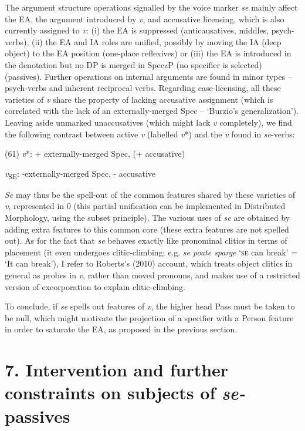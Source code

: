 \documentclass[output=paper]{langsci/langscibook}
\begin{document}
  The argument structure operations signalled by the voice marker \textit{se} mainly affect the EA, the argument introduced by \textit{v}, and accusative licensing, which is also currently assigned to \textit{v}: (i) the EA is suppressed (anticausatives, middles, psych-verbs), (ii) the EA and IA roles are unified, possibly by moving the IA (deep object) to the EA position (one-place reflexives) or (iii) the EA is introduced in the denotation but no DP is merged in Spec\textit{v}P (no specifier is selected) (passives). Further operations on internal arguments are found in minor types – psych-verbs and inherent reciprocal verbs. Regarding case-licensing, all these varieties of \textit{v} share the property of lacking accusative assignment (which is correlated with the lack of an externally-merged Spec – ‘Burzio’s generalization’). Leaving aside unmarked unaccusatives (which might lack \textit{v} completely), we find the following contrast between active \textit{v} (labelled \textit{v}*) and the \textit{v} found in \textit{se}{}-verbs: 

\label{bkm:Ref449274243}(61)  \textit{v}*: + externally-merged Spec, (+ accusative)

\textit{v}\textsubscript{SE}: -externally-merged Spec, - accusative

\textit{Se} may thus be the spell-out of the common features shared by these varieties of \textit{v}, represented in 0 (this partial unification can be implemented in Distributed Morphology, using the subset principle). The various uses of \textit{se} are obtained by adding extra features to this common core (these extra features are not spelled out). As for the fact that \textit{se} behaves exactly like pronominal clitics in terms of placement (it even undergoes clitic-climbing; e.g. \textit{se poate sparge} ‘\textsc{se} can break’ = ‘It can break’), I refer to Roberts’s (2010) account, which treats object clitics in general as probes in \textit{v}, rather than moved pronouns, and makes use of a restricted version of excorporation to explain clitic-climbing.

  To conclude, if \textit{se} spells out features of \textit{v}, the higher head Pass must be taken to be null, which might motivate the projection of a specifier with a Person feature in order to saturate the EA, as proposed in the previous section.

\section{ 7. Intervention and further constraints on subjects of \textit{se-}passives}
\end{document}
